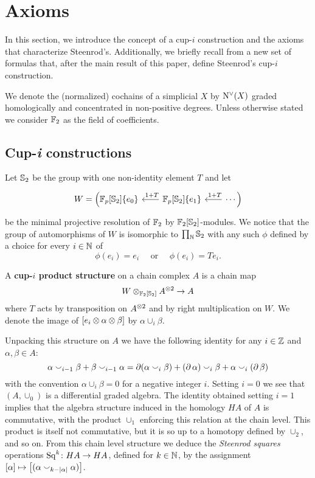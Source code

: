 
\section{Axioms}\label{s:statement}

In this section, we introduce the concept of a cup-$i$ construction and the axioms that characterize Steenrod's.
Additionally, we briefly recall from \cite{medina2023fast_sq} a new set of formulas that, after the main result of this paper, define Steenrod's cup-$i$ construction.

We denote the (normalized) cochains of a simplicial $X$ by $\operatorname{N^{\vee}}(X)$ graded homologically and concentrated in non-positive degrees.
Unless otherwise stated we consider ${\mathbb{F}_2}$ as the field of coefficients.

\subsection{Cup-\textit{i} constructions}

Let $\mathbb{S}_2$ be the group with one non-identity element $T$ and let
\[
\begin{tikzcd}[column sep=20pt]
W = \Big(
\Fp[\sym_2]\{e_0\} &
\Fp[\sym_2]\{e_1\} \arrow[l, "\ 1+T"'] &
\arrow[l, "\ 1+T"'] \cdots \Big)
\end{tikzcd}
\]
be the minimal projective resolution of ${\mathbb{F}_2}$ by ${\mathbb{F}_2}[\mathbb{S}_2]$-modules.
We notice that the group of automorphisms of $W$ is isomorphic to $\prod_{\mathbb{N}} \mathbb{S}_2$ with any such $\phi$ defined by a choice for every $i \in \mathbb{N}$ of
\[
\phi(e_i) = e_i
\quad \text{ or } \quad
\phi(e_i) = Te_i.
\]

\begin{definition}
	A \textbf{\mbox{cup-$i$} product structure} on a chain complex $A$ is a chain map
	\[
	W \otimes_{{\mathbb{F}_2}[\mathbb{S}_2]} A^{\otimes 2} \to A
	\]
	where $T$ acts by transposition on $A^{\otimes 2}$ and by right multiplication on $W$.
	We denote the image of $[e_i \otimes \alpha \otimes \beta]$ by $\alpha \cup_i \beta$.
\end{definition}

Unpacking this structure on $A$ we have the following identity for any $i \in \mathbb{Z}$ and $\alpha, \beta \in A$:
\[
\alpha \smallsmile_{i-1} \beta + \beta \smallsmile_{i-1} \alpha =
\operatorname{\partial} (\alpha \smallsmile_{i} \beta) + (\operatorname{\partial}\alpha) \smallsmile_{i} \beta + \alpha \smallsmile_{i} (\operatorname{\partial}\beta)
\]
with the convention $\alpha \cup_{i} \beta = 0$ for a negative integer $i$.
Setting $i = 0$ we see that $(A, \cup_0)$ is a differential graded algebra.
The identity obtained setting $i = 1$ implies that the algebra structure induced in the homology $HA$ of $A$ is commutative, with the product $\cup_1$ enforcing this relation at the chain level.
This product is itself not commutative, but it is so up to a homotopy defined by $\cup_2$, and so on.
From this chain level structure we deduce the \textit{Steenrod squares} operations $\operatorname{Sq}^k \colon HA \to HA$, defined for $k \in \mathbb{N}$, by the assignment $[\alpha] \mapsto \big[(\alpha \smallsmile_{k-\lvert\alpha\rvert} \alpha)\big]$.

